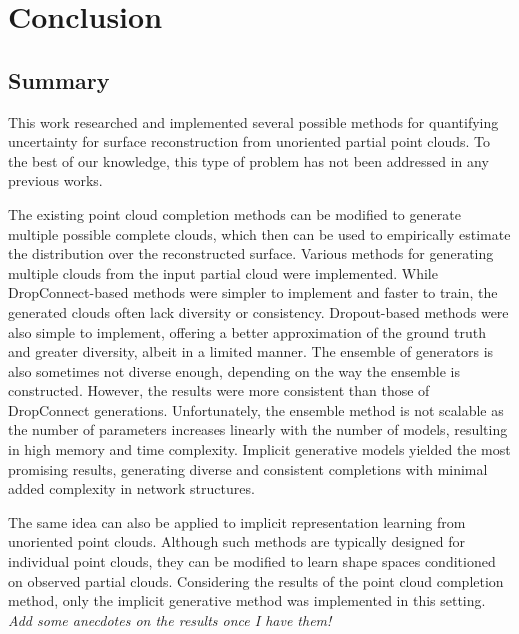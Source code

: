\chapter{Conclusion}\label{ch:conclusion}
\section{Summary}
This work researched and implemented several possible methods for quantifying uncertainty for surface reconstruction from unoriented partial point clouds. To the best of our knowledge, this type of problem has not been addressed in any previous works. 

The existing point cloud completion methods can be modified to generate multiple possible complete clouds, which then can be used to empirically estimate the distribution over the reconstructed surface. Various methods for generating multiple clouds from the input partial cloud were implemented. While DropConnect-based methods were simpler to implement and faster to train, the generated clouds often lack diversity or consistency. Dropout-based methods were also simple to implement, offering a better approximation of the ground truth and greater diversity, albeit in a limited manner. The ensemble of generators is also sometimes not diverse enough, depending on the way the ensemble is constructed. However, the results were more consistent than those of DropConnect generations. Unfortunately, the ensemble method is not scalable as the number of parameters increases linearly with the number of models, resulting in high memory and time complexity. Implicit generative models yielded the most promising results, generating diverse and consistent completions with minimal added complexity in network structures.

The same idea can also be applied to implicit representation learning from unoriented point clouds. Although such methods are typically designed for individual point clouds, they can be modified to learn shape spaces conditioned on observed partial clouds. Considering the results of the point cloud completion method, only the implicit generative method was implemented in this setting. \textit{\color{orange} Add some anecdotes on the results once I have them!} 

